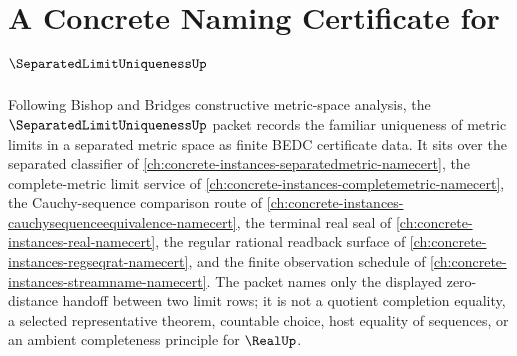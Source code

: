 \chapter{A Concrete Naming Certificate for $\SeparatedLimitUniquenessUp$}
\label{ch:concrete-instances-separated-limit-uniqueness-namecert}

Following Bishop and Bridges constructive metric-space analysis, the $\SeparatedLimitUniquenessUp$ packet records the familiar uniqueness of metric limits in a separated metric space as finite BEDC certificate data. It sits over the separated classifier of \autoref{ch:concrete-instances-separatedmetric-namecert}, the complete-metric limit service of \autoref{ch:concrete-instances-completemetric-namecert}, the Cauchy-sequence comparison route of \autoref{ch:concrete-instances-cauchysequenceequivalence-namecert}, the terminal real seal of \autoref{ch:concrete-instances-real-namecert}, the regular rational readback surface of \autoref{ch:concrete-instances-regseqrat-namecert}, and the finite observation schedule of \autoref{ch:concrete-instances-streamname-namecert}. The packet names only the displayed zero-distance handoff between two limit rows; it is not a quotient completion equality, a selected representative theorem, countable choice, host equality of sequences, or an ambient completeness principle for $\RealUp$.

